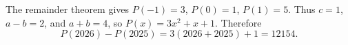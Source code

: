 The remainder theorem gives $P(-1)=3$, $P(0)=1$, $P(1)=5$. Thus $c=1$, $a-b=2$, and $a+b=4$, so $P(x)=3x^2+x+1$. Therefore
\[
P(2026)-P(2025)=3(2026+2025)+1=\boxed{12154}.
\]
